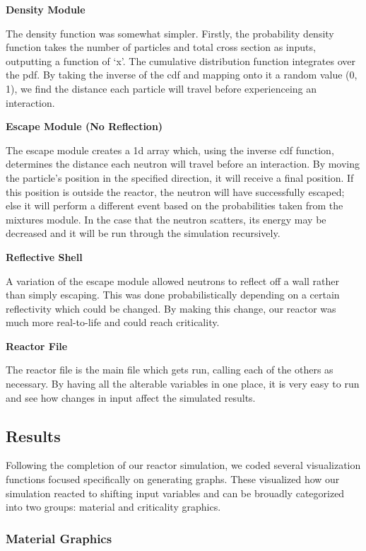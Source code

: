 \documentclass{notes}
\begin{document}
\textbf{Density Module}

The density function was somewhat simpler. Firstly, the probability density function takes the number of particles and total cross section as inputs, outputting a function of `x'. The cumulative distribution function integrates over the pdf. By taking the inverse of the cdf and mapping onto it a random value (0, 1), we find the distance each particle will travel before experienceing an interaction. \cite{OpenMC}

\textbf{Escape Module (No Reflection)}

The escape module creates a 1d array which, using the inverse cdf function, determines the distance each neutron will travel before an interaction. By moving the particle's position in the specified direction, it will receive a final position. If this position is outside the reactor, the neutron will have successfully escaped; else it will perform a different event based on the probabilities taken from the mixtures module. In the case that the neutron scatters, its energy may be decreased and it will be run through the simulation recursively.

\textbf{Reflective Shell}

A variation of the escape module allowed neutrons to reflect off a wall rather than simply escaping. This was done probabilistically depending on a certain reflectivity which could be changed. By making this change, our reactor was much more real-to-life and could reach criticality.

\textbf{Reactor File}

The reactor file is the main file which gets run, calling each of the others as necessary. By having all the alterable variables in one place, it is very easy to run and see how changes in input affect the simulated results.

\subsection*{Results}

Following the completion of our reactor simulation, we coded several visualization functions focused specifically on generating graphs. These visualized how our simulation reacted to shifting input variables and can be brouadly categorized into two groups: material and criticality graphics.

\subsubsection*{Material Graphics}
\end{document}
